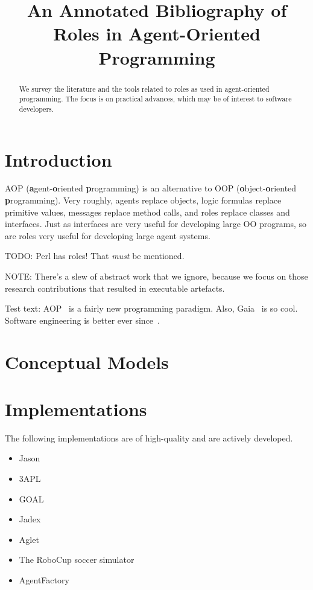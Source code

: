 \documentclass{article}
\title{An Annotated Bibliography of Roles in Agent-Oriented Programming}
\newcommand{\fb}[1]{\textbf{#1}}
\begin{document}
\maketitle
\begin{abstract}
We survey the literature and the tools related to roles as used in agent-oriented programming.
The focus is on practical advances, which may be of interest to software developers.
\end{abstract}

\section{Introduction}

AOP (\fb agent-\fb oriented \fb programming) is an alternative to OOP (\fb object-\fb oriented \fb programming).
Very roughly, agents replace objects, logic formulas replace primitive values, messages replace method calls, and roles replace classes and interfaces.
Just as interfaces are very useful for developing large OO programs, so are roles very useful for developing large agent systems.

TODO: Perl has roles! That \emph{must} be mentioned.

NOTE: There's a slew of abstract work that we ignore, because we focus on those research contributions that resulted in executable artefacts.

Test text:
AOP~\cite{journals/ai/Shoham93} is a fairly new programming paradigm.
Also, Gaia~\cite{journals/aamas/WooldridgeJK00} is so cool.
Software engineering is better ever since~\cite{conf/aose/WooldridgeC00}.

\section{Conceptual Models}

\section{Implementations}

The following implementations are of high-quality and are actively developed.
\begin{itemize}
\item Jason~\cite{books/sp/map2005/BordiniHV05}
\item 3APL~\cite{books/sp/map2005/DastaniRM05}
\item GOAL~\cite{hindriks2009programmingrationalagents}
\item Jadex~\cite{todo}
\item Aglet~\cite{todo}
\item The RoboCup soccer simulator
\item AgentFactory
\end{itemize}
\end{document}
